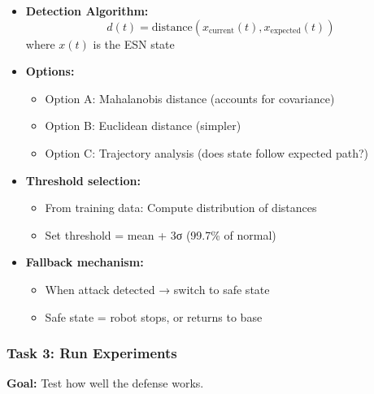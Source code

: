 \documentclass[11pt]{article}
\begin{document}
\begin{itemize}
    \item \textbf{Detection Algorithm:}
    \begin{equation}
    d(t) = \text{distance}(x_{\text{current}}(t), x_{\text{expected}}(t))
    \end{equation}
    where $x(t)$ is the ESN state
    
    \item \textbf{Options:}
    \begin{itemize}
        \item Option A: Mahalanobis distance (accounts for covariance)
        \item Option B: Euclidean distance (simpler)
        \item Option C: Trajectory analysis (does state follow expected path?)
    \end{itemize}
    
    \item \textbf{Threshold selection:}
    \begin{itemize}
        \item From training data: Compute distribution of distances
        \item Set threshold = mean + 3σ (99.7\% of normal)
    \end{itemize}
    
    \item \textbf{Fallback mechanism:}
    \begin{itemize}
        \item When attack detected → switch to safe state
        \item Safe state = robot stops, or returns to base
    \end{itemize}
\end{itemize}

\subsubsection{Task 3: Run Experiments}
\textbf{Goal:} Test how well the defense works.
\end{document}
